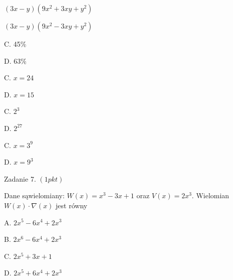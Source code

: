 \documentclass[a4paper,12pt]{article}
\begin{document}
$(3x-y)(9x^{2}+3xy+y^{2})$

$(3x-y)(9x^{2}-3xy+y^{2})$

C. 45\%

D. 63\%

C. $x=24$

D. $x=15$

C. $2^{3}$

D. $2^{27}$

C. $x=3^{9}$

D. $x=9^{3}$

Zadanie 7. $(1pkt)$

Dane sąwielomiany: $W(x)=x^{3}-3x+1$ oraz $V(x)=2x^{3}$. Wielomian $W(x)\cdot\nabla(x)$ jest równy

A. $2x^{5}-6x^{4}+2x^{3}$

B. $2x^{6}-6x^{4}+2x^{3}$

C. $2x^{5}+3x+1$

D. $2x^{5}+6x^{4}+2x^{3}$
\end{document}
